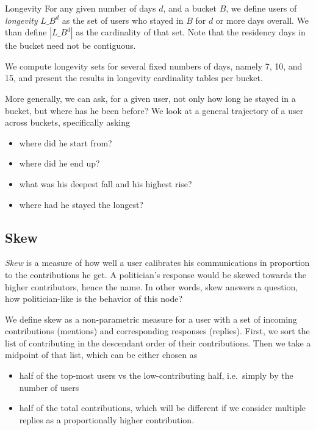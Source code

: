 \documentclass[10pt,oneside]{memoir}
\begin{document}
Longevity
For any given number of days $d$, and a bucket $B$, we define users of {\itshape longevity} $L\_B^d$ as the set of users who stayed in $B$ for $d$ or more days overall.  We than define $|L\_B^d|$ as the cardinality of that set.  Note that the residency days in the bucket need not be contiguous.


We compute longevity sets for several fixed numbers of days, namely 7, 10, and 15, and  present the results in longevity cardinality tables per bucket.


More generally, we can ask, for a given user, not only how long he stayed in a bucket, but where has he been before?  We look at a general trajectory of a user across buckets, specifically asking


\begin{itemize}


\item where did he start from?

\item where did he end up?

\item what was his deepest fall and his highest rise?

\item where had he stayed the longest?
\end{itemize}

\pagebreak \subsection{Skew}
\label{skew}

{\itshape Skew} is a measure of how well a user calibrates his communications in proportion to the contributions he get.  A politician's response would be skewed towards the higher contributors, hence the name.  In other words, skew answers a question, how politician-like is the behavior of this node?


We define skew as a non-parametric measure for a user with a set of incoming contributions (mentions) and corresponding responses (replies).  First, we sort the list of contributing in the descendant order of their contributions.  Then we take a midpoint of that list, which can be either chosen as


\begin{itemize}


\item half of the top-most users vs the low-contributing half, i.e.\ simply by the number of users

\item half of the total contributions, which will be different if we consider multiple replies as a proportionally higher contribution.
\end{itemize}
\end{document}
